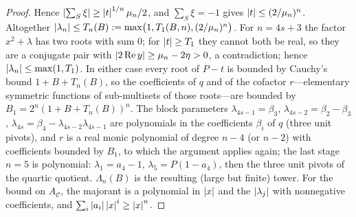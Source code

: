 \begin{proof}
Hence $\left\lvert \sum_S\xi\right\rvert\ge\left\lvert t\right\rvert^{1/n}\mu_n/2$, and $\sum_S\xi=-1$ gives
$\left\lvert t\right\rvert\le(2/\mu_n)^n$.  Altogether
$\left\lvert \lambda_n\right\rvert\le T_n(B):=\max\bigl(1,T_1(B,n),(2/\mu_n)^n\bigr)$.  For
$n=4s+3$ the factor $x^2+\lambda$ has two roots with sum $0$; for
$\left\lvert t\right\rvert\ge T_1$ they cannot both be real, so they are a conjugate pair with
$\left\lvert 2\operatorname{Re}y\right\rvert\ge\mu_n-2\eta>0$, a contradiction; hence
$\left\lvert \lambda_n\right\rvert\le\max(1,T_1)$.  In either case every root of $P-t$ is
bounded by Cauchy's bound $1+B+T_n(B)$, so the coefficients of $q$ and of the
cofactor $r$---elementary symmetric functions of sub-multisets of those
roots---are bounded by $B_1=2^n(1+B+T_n(B))^n$.  The block parameters
$\lambda_{4s-1}=\beta_3$, $\lambda_{4s-2}=\beta_2-\beta_3$,
$\lambda_{4s}=\beta_4-\lambda_{4s-2}\lambda_{4s-1}$ are polynomials in the
coefficients $\beta_i$ of $q$ (three unit pivots), and $r$ is a real monic
polynomial of degree $n-4$ (or $n-2$) with coefficients bounded by $B_1$, to
which the argument applies again; the last stage $n=5$ is polynomial:
$\lambda_1=a_4-1$, $\lambda_5=P(1-a_4)$, then the three unit pivots of the
quartic quotient.  $\Lambda_n(B)$ is the resulting (large but finite) tower.
For the bound on $A_{\mathcal C}$, the majorant is a polynomial in $\left\lvert x\right\rvert$
and the $\left\lvert \lambda_j\right\rvert$ with nonnegative coefficients, and
$\sum_i\left\lvert a_i\right\rvert\left\lvert x\right\rvert^i\ge\left\lvert x\right\rvert^n$.
\end{proof}

